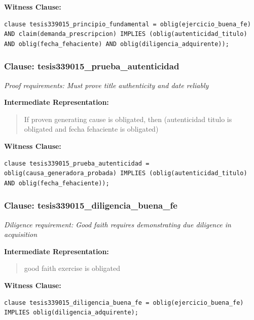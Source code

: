\documentclass[11pt,a4paper]{article}
\begin{document}
\textbf{Witness Clause:}

\begin{lstlisting}[style=witnessstyle, language=Witness]
clause tesis339015_principio_fundamental = oblig(ejercicio_buena_fe) AND claim(demanda_prescripcion) IMPLIES (oblig(autenticidad_titulo) AND oblig(fecha_fehaciente) AND oblig(diligencia_adquirente));
\end{lstlisting}

\subsubsection{Clause: tesis339015\_prueba\_autenticidad}

\textit{Proof requirements: Must prove title authenticity and date reliably}

\textbf{Intermediate Representation:}

\begin{quote}
If proven generating cause is obligated, then (autenticidad titulo is obligated and fecha fehaciente is obligated)
\end{quote}

\textbf{Witness Clause:}

\begin{lstlisting}[style=witnessstyle, language=Witness]
clause tesis339015_prueba_autenticidad = oblig(causa_generadora_probada) IMPLIES (oblig(autenticidad_titulo) AND oblig(fecha_fehaciente));
\end{lstlisting}

\subsubsection{Clause: tesis339015\_diligencia\_buena\_fe}

\textit{Diligence requirement: Good faith requires demonstrating due diligence in acquisition}

\textbf{Intermediate Representation:}

\begin{quote}
good faith exercise is obligated
\end{quote}

\textbf{Witness Clause:}

\begin{lstlisting}[style=witnessstyle, language=Witness]
clause tesis339015_diligencia_buena_fe = oblig(ejercicio_buena_fe) IMPLIES oblig(diligencia_adquirente);
\end{lstlisting}
\end{document}
